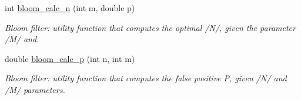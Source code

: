 \begin{DoxyCompactItemize}
int \hyperlink{namespacepfq_1_1lang_1_1anonymous__namespace_02default_8hpp_03_a2385e61b93ec1d91ce7117fe787bae7e}{bloom\+\_\+calc\+\_\+n} (int m, double p)
\begin{DoxyCompactList}\small\item\em Bloom filter\+: utility function that computes the optimal /\+N/, given the parameter /\+M/ and. \end{DoxyCompactList}\item 
double \hyperlink{namespacepfq_1_1lang_1_1anonymous__namespace_02default_8hpp_03_a8d0641a00fb27e53db78af7572b1b3a6}{bloom\+\_\+calc\+\_\+p} (int n, int m)
\begin{DoxyCompactList}\small\item\em Bloom filter\+: utility function that computes the false positive P, given /\+N/ and /\+M/ parameters. \end{DoxyCompactList}\end{DoxyCompactItemize}
